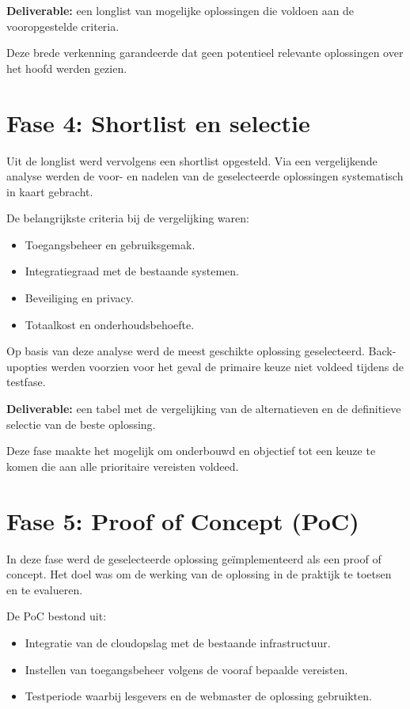 \textbf{Deliverable:} een longlist van mogelijke oplossingen die voldoen aan de vooropgestelde criteria.

Deze brede verkenning garandeerde dat geen potentieel relevante oplossingen over het hoofd werden gezien.

\section{Fase 4: Shortlist en selectie}
Uit de longlist werd vervolgens een shortlist opgesteld. Via een vergelijkende analyse werden de voor- en nadelen van de geselecteerde oplossingen systematisch in 
kaart gebracht.

De belangrijkste criteria bij de vergelijking waren:
\begin{itemize}
    \item Toegangsbeheer en gebruiksgemak.
    \item Integratiegraad met de bestaande systemen.
    \item Beveiliging en privacy.
    \item Totaalkost en onderhoudsbehoefte.
\end{itemize}

Op basis van deze analyse werd de meest geschikte oplossing geselecteerd. 
Back-upopties werden voorzien voor het geval de primaire keuze niet voldeed tijdens de testfase.

\textbf{Deliverable:} een tabel met de vergelijking van de alternatieven en de definitieve selectie van de beste oplossing.

Deze fase maakte het mogelijk om onderbouwd en objectief tot een keuze te komen die aan alle prioritaire vereisten voldeed.

\section{Fase 5: Proof of Concept (PoC)}
In deze fase werd de geselecteerde oplossing geïmplementeerd als een proof of concept. 
Het doel was om de werking van de oplossing in de praktijk te toetsen en te evalueren.

De PoC bestond uit:
\begin{itemize}
    \item Integratie van de cloudopslag met de bestaande infrastructuur.
    \item Instellen van toegangsbeheer volgens de vooraf bepaalde vereisten.
    \item Testperiode waarbij lesgevers en de webmaster de oplossing gebruikten.
\end{itemize}

